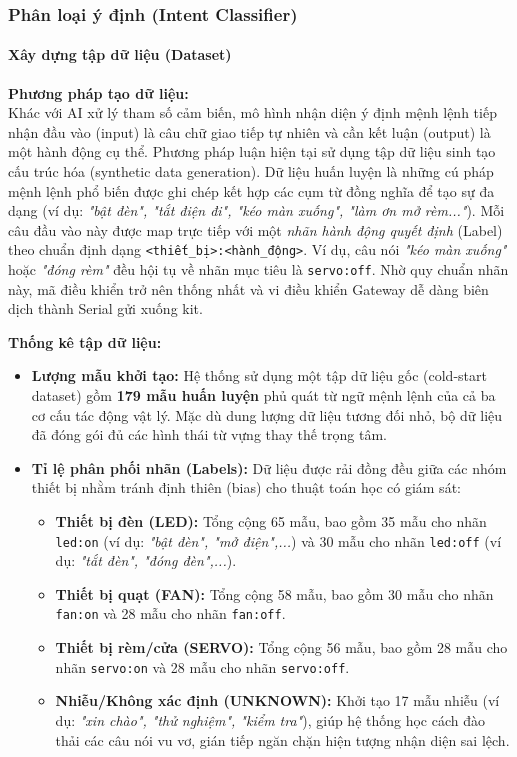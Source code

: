 \subsubsection{Phân loại ý định (Intent Classifier)}

\paragraph{Xây dựng tập dữ liệu (Dataset)}
\textbf{Phương pháp tạo dữ liệu:} \\
Khác với AI xử lý tham số cảm biến, mô hình nhận diện ý định mệnh lệnh tiếp nhận đầu vào (input) là câu chữ giao tiếp tự nhiên và cần kết luận (output) là một hành động cụ thể. Phương pháp luận hiện tại sử dụng tập dữ liệu sinh tạo cấu trúc hóa (synthetic data generation). Dữ liệu huấn luyện là những cú pháp mệnh lệnh phổ biến được ghi chép kết hợp các cụm từ đồng nghĩa để tạo sự đa dạng (ví dụ: \textit{"bật đèn", "tắt điện đi", "kéo màn xuống", "làm ơn mở rèm..."}).
Mỗi câu đầu vào này được map trực tiếp với một \textit{nhãn hành động quyết định} (Label) theo chuẩn định dạng \texttt{<thiết\_bị>:<hành\_động>}. Ví dụ, câu nói \textit{"kéo màn xuống"} hoặc \textit{"đóng rèm"} đều hội tụ về nhãn mục tiêu là \texttt{servo:off}. Nhờ quy chuẩn nhãn này, mã điều khiển trở nên thống nhất và vi điều khiển Gateway dễ dàng biên dịch thành Serial gửi xuống kit.

\textbf{Thống kê tập dữ liệu:}
\begin{itemize}
    \item \textbf{Lượng mẫu khởi tạo:} Hệ thống sử dụng một tập dữ liệu gốc (cold-start dataset) gồm \textbf{179 mẫu huấn luyện} phủ quát từ ngữ mệnh lệnh của cả ba cơ cấu tác động vật lý. Mặc dù dung lượng dữ liệu tương đối nhỏ, bộ dữ liệu đã đóng gói đủ các hình thái từ vựng thay thế trọng tâm.
    \item \textbf{Tỉ lệ phân phối nhãn (Labels):} Dữ liệu được rải đồng đều giữa các nhóm thiết bị nhằm tránh định thiên (bias) cho thuật toán học có giám sát:
    \begin{itemize}
        \item \textbf{Thiết bị đèn (LED):} Tổng cộng 65 mẫu, bao gồm 35 mẫu cho nhãn \texttt{led:on} (ví dụ: \textit{"bật đèn", "mở điện",...}) và 30 mẫu cho nhãn \texttt{led:off} (ví dụ: \textit{"tắt đèn", "đóng đèn",...}).
        \item \textbf{Thiết bị quạt (FAN):} Tổng cộng 58 mẫu, bao gồm 30 mẫu cho nhãn \texttt{fan:on} và 28 mẫu cho nhãn \texttt{fan:off}.
        \item \textbf{Thiết bị rèm/cửa (SERVO):} Tổng cộng 56 mẫu, bao gồm 28 mẫu cho nhãn \texttt{servo:on} và 28 mẫu cho nhãn \texttt{servo:off}.
        \item \textbf{Nhiễu/Không xác định (UNKNOWN):} Khởi tạo 17 mẫu nhiễu (ví dụ: \textit{"xin chào", "thử nghiệm", "kiểm tra"}), giúp hệ thống học cách đào thải các câu nói vu vơ, gián tiếp ngăn chặn hiện tượng nhận diện sai lệch.
    \end{itemize}
\end{itemize}

